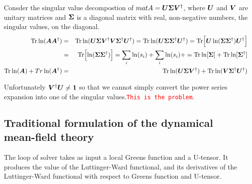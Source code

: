 \documentclass[11pt,a4paper]{report}
\newcommand{\petertt}[1]{\textcolor{red}{\texttt{#1}}}
\begin{document}
Consder the singular value decompostion of
$mat{A}=\bm{U}\bm{\Sigma}\bm{V}^\dagger$, where $\bm{U}$ and $\bm{V}$ are
unitary matrices and $\bm{\Sigma}$ is a diagonal matrix with real,
non-negative numbers, the singular values, on the diagonal.
\begin{eqnarray}
\mathrm{Tr}\ln(\bm{A}\bm{A}^\dagger)
&=&\mathrm{Tr}\ln(\bm{U}\bm{\Sigma}\bm{V}^\dagger
\bm{V}\bm{\Sigma}^\dagger\bm{U}^\dagger)
=\mathrm{Tr}\ln(\bm{U}\bm{\Sigma}\bm{\Sigma}^\dagger\bm{U}^\dagger)
=\mathrm{Tr}\Bigl[\bm{U}\ln(\bm{\Sigma}\bm{\Sigma}^\dagger)\bm{U}^\dagger\Bigr]
\nonumber\\
&=&\mathrm{Tr}\Bigl[\ln(\bm{\Sigma}\bm{\Sigma}^\dagger)\Bigr]
=\sum_i \ln(s_i)+\sum_i \ln(s_i)+
=\mathrm{Tr}\ln[\bm{\Sigma}]+\mathrm{Tr}\ln[\bm{\Sigma}^\dagger]
\nonumber\\
\mathrm{Tr}\ln(\bm{A})+Tr\ln(\bm{A}^\dagger)
&=&\mathrm{Tr}\ln(\bm{U}\bm{\Sigma}\bm{V}^\dagger)
+\mathrm{Tr}\ln(\bm{V}\bm{\Sigma}^\dagger\bm{U}^\dagger)
\end{eqnarray}

Unfortunately $\bm{V}^\dagger\bm{U}\neq\bm{1}$ so that we cannot
simply convert the power series expansion into one of the singular
values.\petertt{This is the problem}.




\subsection{Traditional formulation of the dynamical mean-field theory}
The loop of solver takes as input a local Greens function and a
U-tensor. It produces the value of the Luttinger-Ward functional, and
its derivatives of the Luttinger-Ward functional with respect to
Greens function and U-tensor.
\end{document}
